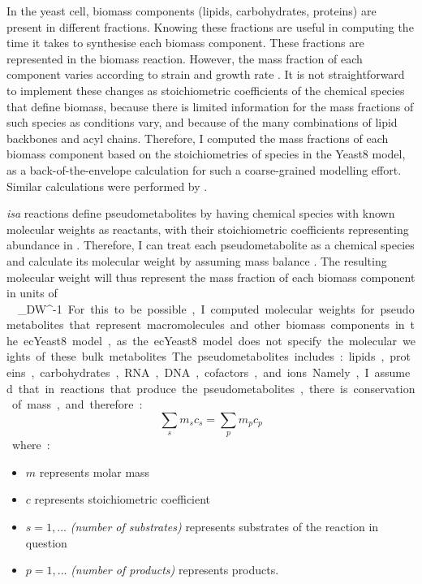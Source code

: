 In the yeast cell, biomass components (lipids, carbohydrates, proteins) are present in different fractions.
Knowing these fractions are useful in computing the time it takes to synthesise each biomass component.
These fractions are represented in the biomass reaction.
However, the mass fraction of each component varies according to strain and growth rate \parencite{nilssonMetabolicTradeoffsYeast2016, elsemmanWholecellModelingYeast2022}.
It is not straightforward to implement these changes as stoichiometric coefficients of the chemical species that define biomass, because there is limited information for the mass fractions of such species as conditions vary, and because of the many combinations of lipid backbones and acyl chains.
Therefore, I computed the mass fractions of each biomass component based on the stoichiometries of species in the Yeast8 model, as a back-of-the-envelope calculation for such a coarse-grained modelling effort.
Similar calculations were performed by \textcite{takhaveevTemporalSegregationBiosynthetic2023}.

\textit{isa} reactions define pseudometabolites by having chemical species with known molecular weights as reactants, with their stoichiometric coefficients representing abundance in \SI{}{\mmolgdw}.
Therefore, I can treat each pseudometabolite as a chemical species and calculate its molecular weight by assuming mass balance \parencite{chanStandardizingBiomassReactions2017, dinhQuantifyingPropagationParametric2022, takhaveevTemporalSegregationBiosynthetic2023}.
The resulting molecular weight will thus represent the mass fraction of each biomass component in units of \SI{}{\gram~\gram_{DW}^{-1}}.

For this to be possible, I computed molecular weights for pseudometabolites that represent macromolecules and other biomass components in the ecYeast8 model, as
the ecYeast8 model does not specify the molecular weights of these bulk metabolites.
The pseudometabolites includes: lipids, proteins, carbohydrates, RNA, DNA, cofactors, and ions.
Namely, I assumed that in reactions that produce the pseudometabolites, there is conservation of mass, and therefore:

\begin{equation}
  \sum_{s}m_{s}c_{s} = \sum_{p}m_{p}c_{p}
\label{eq:conservation-of-mass}
\end{equation}

where:
\begin{itemize}
  \item $m$ represents molar mass
  \item $c$ represents stoichiometric coefficient
  \item $s = 1, ...$ \emph{(number of substrates)} represents substrates of the reaction in question
  \item $p = 1, ...$ \emph{(number of products)} represents products.
\end{itemize}

